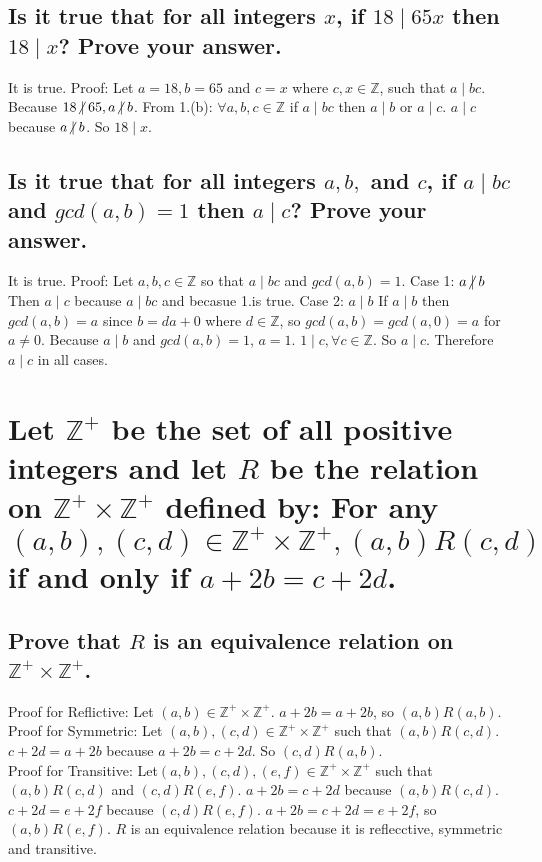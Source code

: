 \documentclass[10pt, letterpaper, titlepage]{article}
\newcommand{\0}{\varnothing}
\newcommand{\Z}{\mathbb{Z}}
\newcommand{\1}{\{ 1 \}}
\newcommand{\2}{\{ (1,1) \}}
\newcommand{\ZXZ}{\Z ^+ \times \Z^+}
\newcommand{\notmid}{\centernot|}
\begin{document}
        \subsection{Is it true that for all integers $x$, if $18 \mid 65x$ then $18 \mid x$? Prove your answer.}
            It is true. Proof: 
            Let $a = 18, b = 65$ and $c = x$ where $c,x \in \Z$, such that $a \mid bc$.
            Because $18 \notmid 65, a \notmid b$.
            From 1.(b): $\forall a,b,c \in \Z$ if $a \mid bc$ then $a \mid b$ or $a \mid c$.
            $a\mid c$ because $a \notmid b$.
            So $18 \mid x$.

        \subsection{Is it true that for all integers $a, b,$ and $c$, if $a \mid bc$ and $gcd(a,b) = 1$ then $a \mid c$? Prove your answer.}
            It is true. Proof:
            Let $a,b,c\in\Z$ so that $a\mid bc$ and $gcd(a,b)=1$.
            Case 1: $a \notmid b$ 
            Then $a \mid c$ because $a \mid bc$ and becasue 1.is true.
            Case 2: $a \mid b$
            If $a \mid b$ then $gcd(a,b) = a$ since $b = da + 0$ where $d \in\Z$, so $gcd(a,b) = gcd(a,0) = a$ for $a \neq 0$.
            Because $a \mid b$ and $gcd(a,b) = 1$, $a = 1$.
            $1 \mid c, \forall c \in\Z$.
            So $a \mid c$.
            Therefore $a \mid c$ in all cases.

    \newpage
    \section{Let $\Z ^+$ be the set of all positive integers and let $R$ be the relation on $\ZXZ$ defined by: For any $(a,b), (c,d) \in \ZXZ, (a,b)R(c,d)$ if and only if $a+2b = c +2d$.}
        \subsection{Prove that $R$ is an equivalence relation on $\ZXZ$.}
            Proof for Reflictive:
            Let $(a,b)\in\ZXZ$.
            $a+2b = a + 2b$, so $(a,b)R(a,b)$.
            \\
            Proof for Symmetric:
            Let $(a,b), (c,d)\in\ZXZ$ such that $(a,b)R(c,d)$.
            $c+2d = a + 2b$ because $a+2b = c + 2d$. So $(c,d)R(a,b)$.
            \\
            Proof for Transitive:
            Let$(a,b),(c,d),(e,f)\in\ZXZ$ such that $(a,b)R(c,d)$ and $(c,d)R(e,f)$.
            $a+2b = c + 2d$ because $(a,b)R(c,d)$.
            $ c + 2d =e +2f$ because $(c,d)R(e,f)$.
            $a+2b = c + 2d =e +2f$, so $(a,b)R(e,f)$.
            $R$ is an equivalence relation because it is reflecctive, symmetric and transitive.
\end{document}
